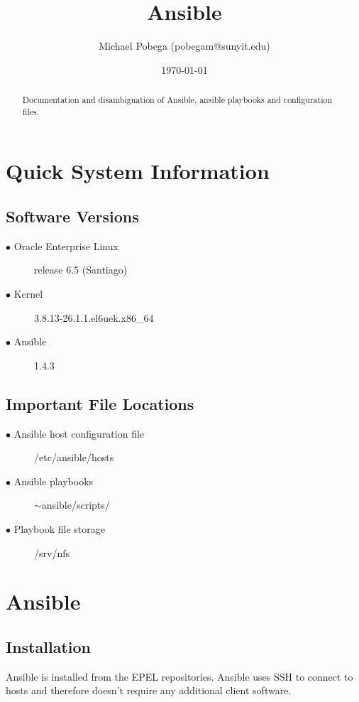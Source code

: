 \documentclass[a4paper]{article}
\title{Ansible}
\author{Michael Pobega (pobegam@sunyit.edu)}
\date{\today}
\begin{document}
\begin{titlepage}
\clearpage\maketitle
\thispagestyle{empty}

\begin{abstract}
Documentation and disambiguation of Ansible, ansible playbooks and configuration files.
\end{abstract}

\clearpage
\thispagestyle{empty}
\tableofcontents
\end{titlepage}
\clearpage

\section{Quick System Information}
\label{sec:info}

\subsection{Software Versions}
\begin{description}
  \item[$\bullet$ Oracle Enterprise Linux] release 6.5 (Santiago)
  \item[$\bullet$ Kernel] 3.8.13-26.1.1.el6uek.x86\_64
  \item[$\bullet$ Ansible] 1.4.3
\end{description}


\subsection{Important File Locations}
\begin{description}
  \item[$\bullet$ Ansible host configuration file] /etc/ansible/hosts
  \item[$\bullet$ Ansible playbooks] $\mathtt{\sim}$ansible/scripts/
  \item[$\bullet$ Playbook file storage] /srv/nfs
\end{description}

\section{Ansible}

\subsection{Installation}
Ansible is installed from the EPEL repositories. Ansible uses SSH to connect to hosts and therefore doesn't require any additional client software. 
\end{document}
